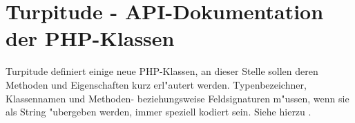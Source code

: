 \chapter{Turpitude - API-Dokumentation der PHP-Klassen}
\label{sec:app2}

Turpitude definiert einige neue PHP-Klassen, an dieser Stelle
sollen deren Methoden und Eigenschaften kurz erl"autert werden.
Typenbezeichner, Klassennamen und Methoden- beziehungsweise
Feldsignaturen 
m"ussen, wenn sie als String "ubergeben werden,
immer speziell kodiert sein. Siehe hierzu \cite{JNIHP}.








